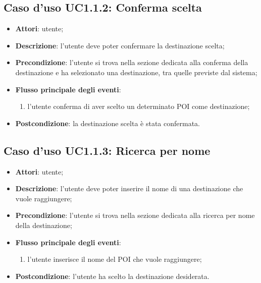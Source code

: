 \documentclass[../AnalisiDeiRequisiti.tex]{subfiles}
\begin{document}
\subsection{Caso d'uso UC1.1.2: Conferma scelta}
\begin{itemize}
\item \textbf{Attori}: utente;
\item \textbf{Descrizione}: l'utente deve poter confermare la destinazione scelta; 
      \item \textbf{Precondizione}: l'utente si trova nella sezione dedicata alla conferma della destinazione e ha selezionato una destinazione, tra quelle previste dal sistema;

        \item \textbf{Flusso principale degli eventi}:
          \begin{enumerate}
          \item l'utente conferma di aver scelto un determinato POI come destinazione;

      \end{enumerate}
    \item \textbf{Postcondizione}: la destinazione scelta è stata confermata.
  \end{itemize}
\hypertarget{UC1.1.3}{}
\subsection{Caso d'uso UC1.1.3: Ricerca per nome}
\begin{itemize}
\item \textbf{Attori}: utente;
\item \textbf{Descrizione}: l'utente deve poter inserire il nome di una destinazione che vuole raggiungere; 
      \item \textbf{Precondizione}: l'utente si trova nella sezione dedicata alla ricerca per nome della destinazione;

        \item \textbf{Flusso principale degli eventi}:
          \begin{enumerate}
          \item l'utente inserisce il nome del POI che vuole raggiungere;

      \end{enumerate}
    \item \textbf{Postcondizione}: l'utente ha scelto la destinazione desiderata.
  \end{itemize}
\hypertarget{UC1.1.4}{}
\end{document}
